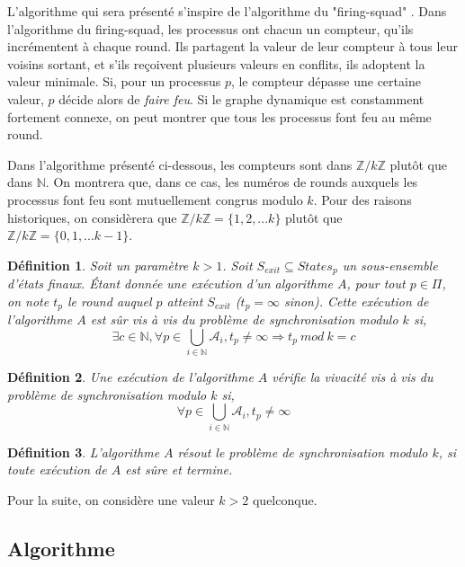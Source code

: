 \documentclass{article}
\newtheorem{definition}{Définition}
\begin{document}
L'algorithme qui sera présenté s'inspire de l'algorithme du "firing-squad" \cite{firing_squad}.
Dans l'algorithme du firing-squad, les processus ont chacun un compteur, qu'ils incrémentent à chaque round. Ils partagent la valeur de leur compteur à tous leur voisins sortant, 
et s'ils reçoivent plusieurs valeurs en conflits, ils adoptent la valeur minimale.
Si, pour un processus $p$, le compteur dépasse une certaine valeur, $p$ décide alors de \emph{faire feu}.
Si le graphe dynamique est constamment fortement connexe, on peut montrer que tous les processus font feu au même round.

Dans l'algorithme présenté ci-dessous, les compteurs sont dans $\mathds{Z}/k\mathds{Z}$ plutôt que dans $\mathds{N}$.
On montrera que, dans ce cas, les numéros de rounds auxquels les processus font feu sont mutuellement congrus modulo $k$.
Pour des raisons historiques, on considèrera que $\mathds{Z}/k\mathds{Z} = \{1, 2, ... k\}$ plutôt que $\mathds{Z}/k\mathds{Z} = \{0, 1, ... k-1\}$.

\begin{definition}

	Soit un paramètre $k > 1$. Soit $S_{exit} \subseteq States_p$ un sous-ensemble d'états finaux.
	Étant donnée une exécution d'un algorithme $A$, pour tout $p \in \Pi$, on note $t_p$ le round auquel $p$ atteint $S_{exit}$ ($t_p = \infty$ sinon).
	Cette exécution de l'algorithme $A$ est sûr vis à vis du problème de synchronisation modulo $k$ si,
	$$\exists c \in \mathds{N}, \forall p \in \bigcup\limits_{i \in \mathds{N}} \mathcal{A}_i, t_p \neq \infty \Rightarrow t_p~mod~k = c$$

\end{definition}

\begin{definition}

	Une exécution de l'algorithme $A$ vérifie la vivacité vis à vis du problème de synchronisation modulo $k$ si,
	$$\forall p \in \bigcup\limits_{i \in \mathds{N}} \mathcal{A}_i, t_p \neq \infty$$

\end{definition}
\begin{definition}
	L'algorithme $A$ résout le problème de synchronisation modulo $k$, si toute exécution de $A$ est sûre et termine.
\end{definition}

Pour la suite, on considère une valeur $k > 2$ quelconque.

\subsection{Algorithme}
\end{document}

